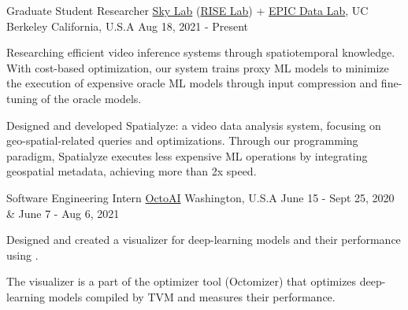 \begin{cventries}
  \cvwork
    {Graduate Student Researcher} %
    {
        \href{https://sky.cs.berkeley.edu/}{Sky Lab}
        (\href{https://rise.cs.berkeley.edu/}{RISE Lab}) +
        \href{https://epic.berkeley.edu/}{EPIC Data Lab}, UC Berkeley
    } %
    {California, U.S.A} %
    {Aug 18, 2021 - Present} %
    {
      \begin{cvitems} %
        \item{Researching efficient video inference systems through spatiotemporal knowledge.
        With cost-based optimization, our system trains proxy ML models to minimize the execution of expensive oracle ML models through input compression and fine-tuning of the oracle models.}
        \item{Designed and developed Spatialyze: a video data analysis system, focusing on geo-spatial-related queries and optimizations. Through our programming paradigm, Spatialyze executes less expensive ML operations by integrating geospatial metadata, achieving more than 2x speed.}
      \end{cvitems}
    }

  \cvwork
    {Software Engineering Intern} %
    {\href{https://www.forbes.com/sites/janakirammsv/2024/09/30/nvidia-acquires-octoai-to-dominate-enterprise-generative-ai-solutions/}{OctoAI}} %
    {Washington, U.S.A} %
    {June 15 - Sept 25, 2020 \& June 7 - Aug 6, 2021} %
    {
      \begin{cvitems} %
          \item{Designed and created a visualizer for deep-learning models and their performance using \underline{}.}
          \item{The visualizer is a part of the optimizer tool (Octomizer) that optimizes deep-learning models compiled by TVM and measures their performance.}
      \end{cvitems}
    }


\end{cventries}
